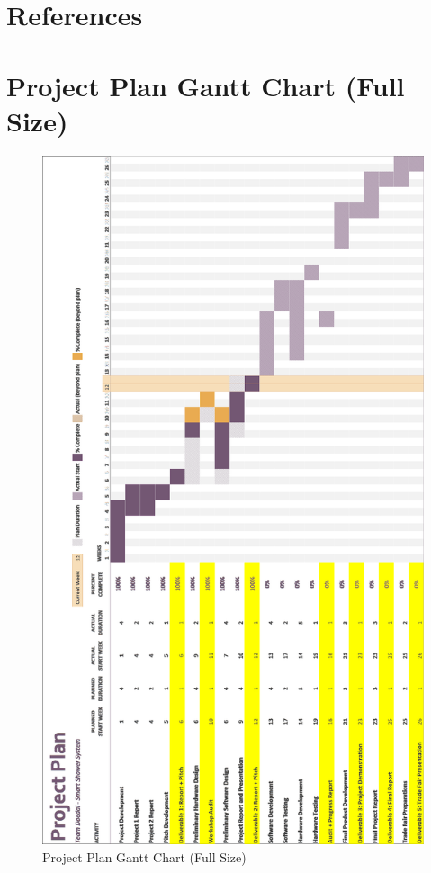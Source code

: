 \documentclass[12pt, a4paper]{article}
\begin{document}
    \newpage
    \section{References}
        \printbibliography

    \newpage
    \appendix
        \section{Project Plan Gantt Chart (Full Size)}
            \begin{figure}[H]
                \centering
                \includegraphics[width=0.8\linewidth]{img/Gantt_Chart_Final_Vertical.png}
                \caption{Project Plan Gantt Chart (Full Size)}
            \end{figure}
        \newpage
\end{document}
